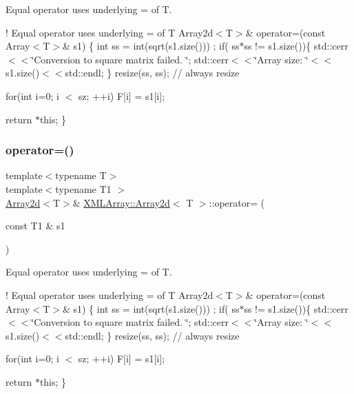 Equal operator uses underlying = of T. 

! Equal operator uses underlying = of T Array2d$<$\+T$>$\& operator=(const Array$<$\+T$>$\& s1) \{ int ss = int(sqrt(s1.\+size())) ; if( ss$\ast$ss != s1.\+size())\{ std\+::cerr$<$$<$\char`\"{}\+Conversion to square matrix failed. \char`\"{}; std\+::cerr$<$$<$\char`\"{}\+Array size\+: \char`\"{}$<$$<$s1.\+size()$<$$<$std\+::endl; \} resize(ss, ss); // always resize

for(int i=0; i $<$ sz; ++i) F\mbox{[}i\mbox{]} = s1\mbox{[}i\mbox{]};

return $\ast$this; \} \mbox{\label{classXMLArray_1_1Array2d_a2ac560b13ec78975a0cab0b2dcbfe72f}} 
\subsubsection{\texorpdfstring{operator=()}{operator=()}\hspace{0.1cm}{\footnotesize\ttfamily [6/6]}}
{\footnotesize\ttfamily template$<$typename T$>$ \\
template$<$typename T1 $>$ \\
\mbox{\hyperlink{classXMLArray_1_1Array2d}{Array2d}}$<$T$>$\& \mbox{\hyperlink{classXMLArray_1_1Array2d}{X\+M\+L\+Array\+::\+Array2d}}$<$ T $>$\+::operator= (\begin{DoxyParamCaption}\item[{const T1 \&}]{s1 }\end{DoxyParamCaption})\hspace{0.3cm}{\ttfamily [inline]}}



Equal operator uses underlying = of T. 

! Equal operator uses underlying = of T Array2d$<$\+T$>$\& operator=(const Array$<$\+T$>$\& s1) \{ int ss = int(sqrt(s1.\+size())) ; if( ss$\ast$ss != s1.\+size())\{ std\+::cerr$<$$<$\char`\"{}\+Conversion to square matrix failed. \char`\"{}; std\+::cerr$<$$<$\char`\"{}\+Array size\+: \char`\"{}$<$$<$s1.\+size()$<$$<$std\+::endl; \} resize(ss, ss); // always resize

for(int i=0; i $<$ sz; ++i) F\mbox{[}i\mbox{]} = s1\mbox{[}i\mbox{]};

return $\ast$this; \} \mbox{\label{classXMLArray_1_1Array2d_a1e5b7fa596ec682113700320b08e66d5}} 
